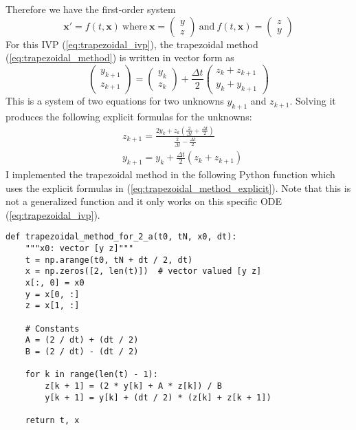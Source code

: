 \documentclass{article}
\begin{document}
Therefore we have the first-order system
\begin{equation} \label{eq:system-in-2ab}
\bm{x}' = f(t, \bm{x})\ \textrm{where}\ \bm{x} = \begin{pmatrix}y \\ z\end{pmatrix}\ \textrm{and}\ f(t,\bm{x}) = \begin{pmatrix}z \\ y\end{pmatrix}
\end{equation}
For this IVP (\ref{eq:trapezoidal_ivp}), the trapezoidal method (\ref{eq:trapezoidal_method}) is written in vector form as
\begin{equation} \label{eq:trapezoidal_method_vector_form}
\begin{pmatrix}y_{k+1} \\ z_{k+1}\end{pmatrix} = \begin{pmatrix}y_k \\ z_k\end{pmatrix} + \frac{\Delta t}{2}\begin{pmatrix}z_k + z_{k+1} \\ y_k + y_{k+1}\end{pmatrix}
\end{equation}
This is a system of two equations for two unknowns \(y_{k+1}\) and \(z_{k+1}\).  Solving it produces the following explicit formulas for the unknowns:
\begin{equation} \label{eq:trapezoidal_method_explicit}
\begin{split}
& z_{k+1} = \frac{2y_k + z_k(\frac{2}{\Delta t} + \frac{\Delta t}{2})}{\frac{2}{\Delta t} - \frac{\Delta t}{2}} \\
& y_{k+1} = y_k + \frac{\Delta t}{2}(z_k + z_{k+1})
\end{split}
\end{equation}
I implemented the trapezoidal method in the following Python function which uses the explicit formulas in (\ref{eq:trapezoidal_method_explicit}). Note that this is not a generalized function and it only works on this specific ODE (\ref{eq:trapezoidal_ivp}).
\begin{verbatim}
def trapezoidal_method_for_2_a(t0, tN, x0, dt):
    """x0: vector [y z]"""
    t = np.arange(t0, tN + dt / 2, dt)
    x = np.zeros([2, len(t)])  # vector valued [y z]
    x[:, 0] = x0
    y = x[0, :]
    z = x[1, :]

    # Constants
    A = (2 / dt) + (dt / 2)
    B = (2 / dt) - (dt / 2)

    for k in range(len(t) - 1):
        z[k + 1] = (2 * y[k] + A * z[k]) / B
        y[k + 1] = y[k] + (dt / 2) * (z[k] + z[k + 1])

    return t, x
\end{verbatim}
\end{document}
